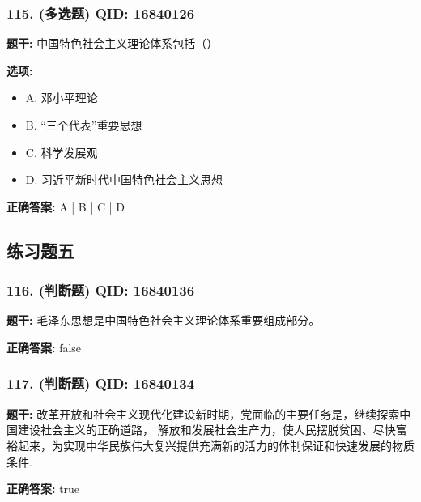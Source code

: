 \documentclass[12pt,UTF8]{ctexart}
\begin{document}
\subsubsection*{115. (多选题) \small QID: 16840126}

\textbf{题干:}
中国特色社会主义理论体系包括（）

\textbf{选项:}
\begin{itemize}[leftmargin=*]

  \item A. 邓小平理论

  \item B. “三个代表”重要思想

  \item C. 科学发展观

  \item D. 习近平新时代中国特色社会主义思想

\end{itemize}

\textbf{正确答案:}
A | B | C | D

\vspace{0.3em}\hrulefill\vspace{0.7em}

\subsection*{练习题五}

\subsubsection*{116. (判断题) \small QID: 16840136}

\textbf{题干:}
毛泽东思想是中国特色社会主义理论体系重要组成部分。

\textbf{正确答案:}
false

\vspace{0.3em}\hrulefill\vspace{0.7em}

\subsubsection*{117. (判断题) \small QID: 16840134}

\textbf{题干:}
改革开放和社会主义现代化建设新时期，党面临的主要任务是，继续探索中国建设社会主义的正确道路， 解放和发展社会生产力，使人民摆脱贫困、尽快富裕起来，为实现中华民族伟大复兴提供充满新的活力的体制保证和快速发展的物质条件.

\textbf{正确答案:}
true
\end{document}
